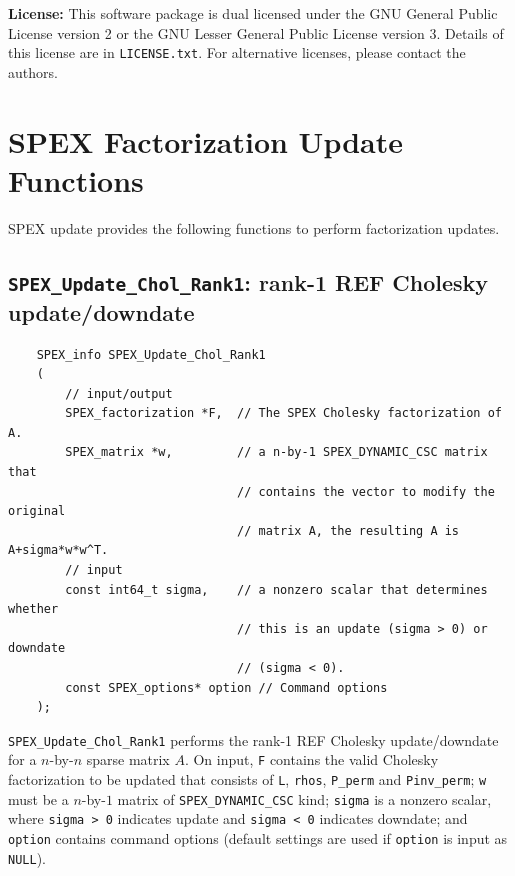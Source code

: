 \documentclass[12pt,oneside]{book}
\theoremstyle{definition}
\begin{document}
{\noindent \textbf{License:} This software package is dual licensed under the GNU General Public License version 2 or the GNU Lesser General Public License version 3. Details of this license are in \verb|LICENSE.txt|. For alternative licenses, please contact the authors.


\section{SPEX Factorization Update Functions} 
SPEX update provides the following functions to perform factorization updates.

\subsection{\texttt{SPEX\_Update\_Chol\_Rank1}: rank-1 REF Cholesky update/downdate}\label{ss:SPEX_Update_Chol_Rank1}
\begin{mdframed}[userdefinedwidth=\textwidth]
{\footnotesize
\begin{verbatim}
    SPEX_info SPEX_Update_Chol_Rank1
    (
        // input/output
        SPEX_factorization *F,  // The SPEX Cholesky factorization of A. 
        SPEX_matrix *w,         // a n-by-1 SPEX_DYNAMIC_CSC matrix that
                                // contains the vector to modify the original
                                // matrix A, the resulting A is A+sigma*w*w^T. 
        // input
        const int64_t sigma,    // a nonzero scalar that determines whether
                                // this is an update (sigma > 0) or downdate
                                // (sigma < 0).
        const SPEX_options* option // Command options
    );
\end{verbatim}
} \end{mdframed}

\verb|SPEX_Update_Chol_Rank1| performs the rank-1 REF Cholesky update/downdate for a $n$-by-$n$ sparse matrix $A$. On input, \verb|F| contains the valid Cholesky factorization to be updated that consists of \verb|L|, \verb|rhos|, \verb|P_perm| and \verb|Pinv_perm|; \verb|w| must be a $n$-by-$1$  matrix of \verb|SPEX_DYNAMIC_CSC| kind; \verb|sigma| is a nonzero scalar, where \verb|sigma > 0| indicates update and \verb|sigma < 0| indicates downdate; and \verb|option| contains command options (default settings are used if \verb|option| is input as \verb|NULL|).

}
\end{document}
